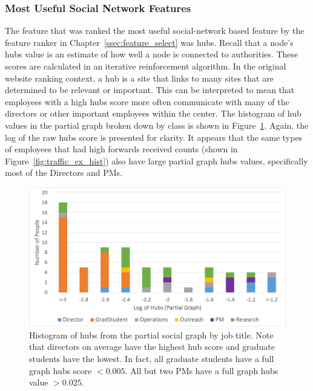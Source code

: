\documentclass[12pt]{report}
\begin{document}
\subsubsection{Most Useful Social Network Features}
The feature that was ranked the most useful social-network based feature by the feature ranker in Chapter~\ref{ssec:feature_select} was hubs.
Recall that a node's hubs value is an estimate of how well a node is connected to authorities.
These scores are calculated in an iterative reinforcement algorithm.
In the original website ranking context, a hub is a site that links to many sites that are determined to be relevant or important.
This can be interpreted to mean that employees with a high hubs score more often communicate with many of the directors or other important employees within the center.
The histogram of hub values in the partial graph broken down by class is shown in Figure~\ref{fig:social_ex_hist}.
Again, the log of the raw hubs score is presented for clarity.
It appears that the same types of employees that had high forwards received counts (shown in Figure~\ref{fig:traffic_ex_hist}) also have large partial graph hubs values, specifically most of the Directors and PMs.

\begin{figure}[t]
    \centering
        \includegraphics[width=\columnwidth,trim={2mm 3mm 2mm 3mm},clip]{Hubs_hist}
        \vspace{-17pt}
        \caption[Histogram of the hubs feature for the partial graph]{Histogram of hubs from the partial social graph by job title.  Note that directors on average have the highest hub score and graduate students have the lowest.  In fact, all graduate students have a full graph hubs score $<0.005$.  All but two PMs have a full graph hubs value $>0.025$.}
        \label{fig:social_ex_hist}
\end{figure}
\end{document}
